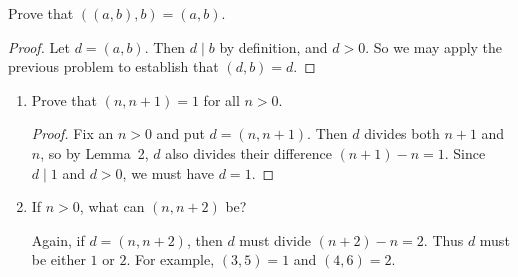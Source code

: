  Prove that $((a,b), b) = (a,b)$.
\begin{proof}
  Let $d = (a,b)$. Then $d\mid b$ by definition, and $d > 0$. So we
  may apply the previous problem to establish that $(d,b) = d$.
\end{proof}

\begin{enumerate}
\item Prove that $(n, n + 1) = 1$ for all $n > 0$.
  \begin{proof}
    Fix an $n>0$ and put $d = (n, n+1)$. Then $d$ divides both $n+1$
    and $n$, so by Lemma~2, $d$ also divides their difference
    $(n + 1) - n = 1$. Since $d\mid1$ and $d > 0$, we must have
    $d = 1$.
  \end{proof}
\item If $n > 0$, what can $(n, n+2)$ be?
  \begin{solution}
    Again, if $d = (n, n+2)$, then $d$ must divide $(n+2) - n =
    2$. Thus $d$ must be either $1$ or $2$. For example, $(3,5) = 1$
    and $(4,6) = 2$.
  \end{solution}
\end{enumerate}
